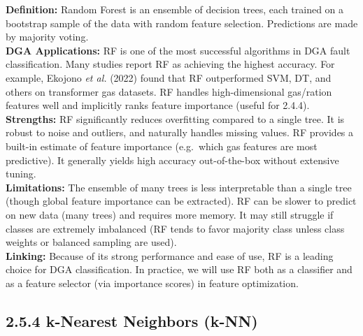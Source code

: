 \textbf{Definition:} Random Forest is an ensemble of decision trees,
each trained on a bootstrap sample of the data with random feature
selection. Predictions are made by majority voting.\\
\textbf{DGA Applications:} RF is one of the most successful algorithms
in DGA fault classification. Many studies report RF as achieving the
highest accuracy. For example, Ekojono \emph{et al.} (2022) found that
RF outperformed SVM, DT, and others on transformer gas datasets. RF
handles high-dimensional gas/ration features well and implicitly ranks
feature importance (useful for 2.4.4).\\
\textbf{Strengths:} RF significantly reduces overfitting compared to a
single tree. It is robust to noise and outliers, and naturally handles
missing values. RF provides a built-in estimate of feature importance
(e.g.~which gas features are most predictive). It generally yields high
accuracy out-of-the-box without extensive tuning.\\
\textbf{Limitations:} The ensemble of many trees is less interpretable
than a single tree (though global feature importance can be extracted).
RF can be slower to predict on new data (many trees) and requires more
memory. It may still struggle if classes are extremely imbalanced (RF
tends to favor majority class unless class weights or balanced sampling
are used).\\
\textbf{Linking:} Because of its strong performance and ease of use, RF
is a leading choice for DGA classification. In practice, we will use RF
both as a classifier and as a feature selector (via importance scores)
in feature optimization.

\subsection{2.5.4 k-Nearest Neighbors
(k-NN)}\label{k-nearest-neighbors-k-nn}

